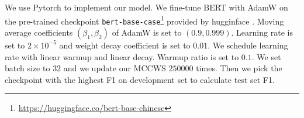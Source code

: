 \documentclass[11pt]{article}
\begin{document}


We use Pytorch \cite{paszke-etal-2019-pytorch} to implement our model.
We fine-tune BERT with AdamW \cite{loshchilov2018decoupled} on the pre-trained checkpoint \texttt{bert-base-case}\footnote{\url{https://huggingface.co/bert-base-chinese}} provided by hugginface \cite{wolf2019huggingface}.
Moving average coefficients \((\beta_1, \beta_2)\) of AdamW is set to \((0.9, 0.999)\).
Learning rate is set to \(2 \times 10^{-5}\) and weight decay coefficient is set to \(0.01\).
We schedule learning rate with linear warmup and linear decay.
Warmup ratio is set to \(0.1\).
We set batch size to \(32\) and we update our MCCWS \(250000\) times.
Then we pick the checkpoint with the highest F1 on development set to calculate test set F1.
\end{document}
